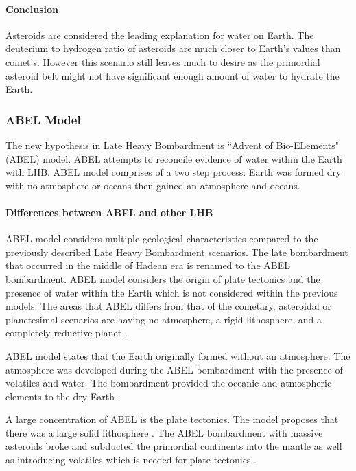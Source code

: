 \paragraph{Conclusion}
Asteroids are considered the leading explanation for water on Earth. 
The deuterium to hydrogen ratio of asteroids are much closer to Earth's values than comet's. 
However this scenario still leaves much to desire as the primordial asteroid belt might not have significant enough amount of water to hydrate the Earth.

\subsubsection{ABEL Model}
The new hypothesis in Late Heavy Bombardment is ``Advent of Bio-ELements" (ABEL) model\cite{ABEL_1}. 
ABEL attempts to reconcile evidence of water within the Earth with LHB. ABEL model comprises of a two step process: Earth was formed dry with no atmosphere or oceans then gained an atmosphere and oceans. 

\newpage
\paragraph{Differences between ABEL and other LHB}
ABEL model considers multiple geological characteristics compared to the previously described Late Heavy Bombardment scenarios. 
The late bombardment that occurred in the middle of Hadean era is renamed to the ABEL bombardment.
ABEL model considers the origin of plate tectonics and the presence of water within the Earth which is not considered within the previous models. 
The areas that ABEL differs from that of the cometary, asteroidal or planetesimal scenarios are having no atmosphere, a rigid lithosphere, and a completely reductive planet \cite{ABEL_1}.

ABEL model states that the Earth originally formed without an atmosphere. The atmosphere was developed during the ABEL bombardment with the presence of volatiles and water. The bombardment provided the oceanic and atmospheric elements to the dry Earth \cite{ABEL_2}.

A large concentration of ABEL is the plate tectonics. The model proposes that there was a large solid lithosphere \cite{ABEL_2}. The ABEL bombardment with massive asteroids broke and subducted the primordial continents into the mantle as well as  introducing volatiles which is needed for plate tectonics \cite{ABEL_3}. 

